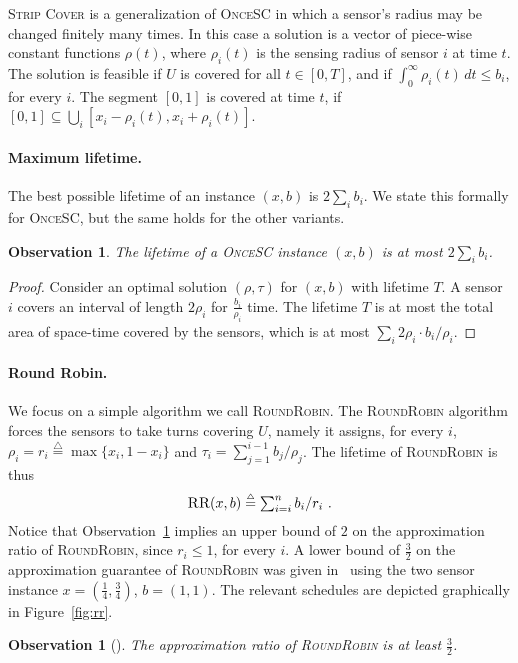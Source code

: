 \documentclass[11pt]{article}
\newtheorem{observation}[lemma]{Observation}
\newcommand{\eqdf}{\stackrel{\scriptscriptstyle \triangle}{=}}
\newcommand{\threehalves}{\frac{3}{2}}
\newcommand{\strip}{\textsc{Strip Cover}\xspace}
\newcommand{\sosc}{\textsc{OnceSC}\xspace}
\newcommand{\rr}{\textsc{RoundRobin}\xspace}
\newcommand{\RR}{\textsc{RR}\xspace}
\begin{document}
\strip is a generalization of \sosc in which a sensor's radius may be 
changed finitely many times.  In this case a solution is a vector of
piece-wise constant functions $\rho(t)$, where $\rho_i(t)$ is the
sensing radius of sensor $i$ at time $t$. The solution is feasible if
$U$ is covered for all $t \in [0,T]$, and if $\int_0^\infty \rho_i(t)
\, dt \leq b_i$, for every $i$.
The segment $[0,1]$ is covered at time $t$, if 
\(
[0,1] \subseteq \bigcup_i [x_i-\rho_i(t),x_i+\rho_i(t)] 
\).



\paragraph*{\bf Maximum lifetime.}
The best possible lifetime of an instance $(x,b)$ is $2\sum_i b_i$.
We state this formally for \sosc, but the same holds for the other
variants.


\begin{observation}
\label{obs:lifetime}
The lifetime of a
\sosc instance $(x,b)$ is at most $2\sum_i b_i$.
\end{observation}
\begin{proof}
Consider an optimal solution $(\rho,\tau)$ for $(x,b)$ with lifetime
$T$.  A sensor $i$ covers an interval of length $2\rho_i$ for
$\frac{b_i}{\rho_i}$ time.  The lifetime $T$
is at most the total area of space-time covered by the sensors, which
is at most $\sum_i 2 \rho_i \cdot b_i/\rho_i$.
\end{proof}



\paragraph*{\bf Round Robin.} 
We focus on a simple algorithm we call \rr.  The \rr algorithm forces
the sensors to take turns covering $U$, namely it assigns, for every
$i$, $\rho_i = r_i \eqdf \max \{x_i,1-x_i\}$ and $\tau_i =
\sum_{j=1}^{i-1} b_j/\rho_j$.  
The lifetime of \rr is thus
\[\textstyle
\RR(x,b) \eqdf \sum_{i=i}^n b_i/r_i
~.
\]
Notice that Observation~\ref{obs:lifetime} implies an upper bound of
$2$ on the approximation ratio of \rr, since $r_i \leq 1$, for every
$i$.
A lower bound of $\threehalves$ on the approximation guarantee of \rr
was given in~\cite{barnoy2011maximizing} using the two sensor instance
$x = (\frac{1}{4},\frac{3}{4})$, $b = (1,1)$.  The relevant schedules
are depicted graphically in Figure~\ref{fig:rr}.

\begin{observation}[\cite{barnoy2011maximizing}]
\label{obs:rr}
The approximation ratio of \rr is at least $\frac{3}{2}$.
\end{observation}
\end{document}

